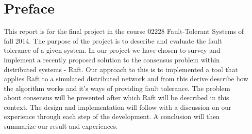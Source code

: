 \thispagestyle{empty}

\section*{Preface} %
\label{sec:preface}

This report is for the final project in the course 02228 Fault-Tolerant Systems of fall 2014. The purpose of the project is to describe and evaluate the fault tolerance of a given system. In our project we have chosen to survey and implement a recently proposed solution to the consensus problem within distributed systems - Raft.
Our approach to this is to implemented a tool that applies Raft to a simulated distributed network and from this derive describe how the algorithm works and it's ways of providing fault tolerance. The problem about consensus will be presented after which Raft will be described in this context. The design and implementation will follow with a discussion on our experience through each step of the development.
A conclusion will then summarize our result and experiences.

